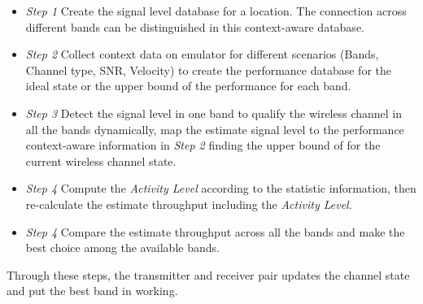 \begin{itemize}
\item \emph{Step 1} Create the signal level database for a location. The connection across different bands can be distinguished in this context-aware database.
\item \emph{Step 2} Collect context data on emulator for different scenarios (Bands, Channel type, SNR, Velocity) to create the performance database for the ideal state or the upper bound of the performance for each band.
\item \emph{Step 3} Detect the signal level in one band to qualify the wireless channel in all the bands dynamically, map the estimate signal level to the performance context-aware information in \emph{Step 2} finding the upper bound of for the current wireless channel state.  
\item \emph{Step 4} Compute the \emph{Activity Level} according to the statistic information, then re-calculate the estimate throughput including the \emph{Activity Level}.
\item \emph{Step 4} Compare the estimate throughput across all the bands and make the best choice among the available bands.
\end{itemize}

Through these steps, the transmitter and receiver pair updates the channel state and put the best band in working.









